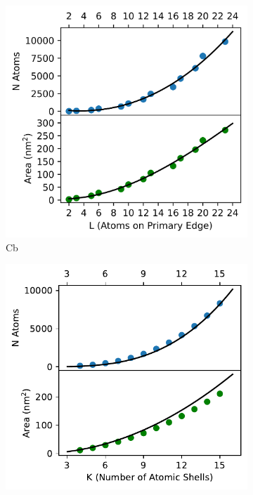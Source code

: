 \begin{figure}
\begin{subfigure}[b]{0.425\textwidth}
    \end{subfigure}
\begin{subfigure}[b]{0.425\textwidth}
    \includegraphics[width=\textwidth]{figures/Theory/Cube_Sizes.png}
    \caption{Cb}
    \label{Fig:NPs_Cb}
    \end{subfigure}
\begin{subfigure}[b]{0.425\textwidth}
    \includegraphics[width=\textwidth]{figures/Theory/Ih_Sizes.pdf}

\end{subfigure}
\end{figure}

